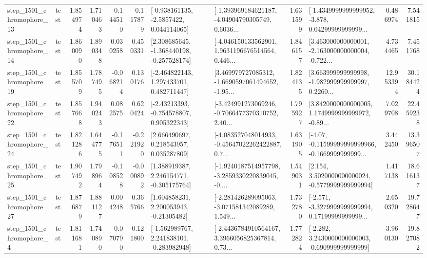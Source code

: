 \begin{tabular}{llrrrrllrlrr}
 step\_1501\_chromophore\_13 &      test &      1.854974 &    1.710463 &     -0.144510 & -0.117879 &     [-0.938161135, -2.5857422, 0.044114065] &  [-1.393969184621187, -4.04904790305749, 0.6036... &       1.631599 &  [-1.4349999999999952, -3.878, 0.04299999999999... &            0.486974 &          7.541815 \\
 step\_1501\_chromophore\_14 &      test &      1.860090 &    1.890348 &      0.030258 &  0.450331 &   [2.308685645, -1.368440198, -0.257528174] &  [-4.046150133562901, 1.9631196676514564, 0.446... &       1.846157 &  [3.463000000000001, -2.163000000000004, -0.722... &            4.734465 &          7.451768 \\
 step\_1501\_chromophore\_19 &      test &      1.855709 &    1.787495 &     -0.068214 &  0.130176 &    [-2.464822143, 1.297433701, 0.482711447] &  [3.469979727085312, -1.6690597061494652, -1.95... &       1.824135 &  [3.663999999999998, -1.982999999999997, 0.2260... &           12.953394 &         30.184424 \\
 step\_1501\_chromophore\_22 &      test &      1.857668 &    1.940243 &      0.082575 &  0.620424 &    [-2.43213393, -0.754578807, 0.905322343] &  [-3.424991273069246, -0.7066477370310752, 2.40... &       1.795927 &  [3.8420000000000005, 1.1749999999999972, -0.89... &            7.029708 &         22.459238 \\
 step\_1501\_chromophore\_24 &      test &      1.821286 &    1.644775 &     -0.176511 & -0.221920 &     [2.666490697, 0.218543957, 0.035287809] &  [-4.083527048014933, -0.45647022262422887, 0.7... &       1.631905 &  [-4.07, -0.11599999999999966, -0.1669999999999... &            3.442450 &         13.396507 \\
 step\_1501\_chromophore\_25 &      test &      1.907492 &    1.798964 &     -0.108528 & -0.000892 &    [1.388919387, 2.246154771, -0.305175764] &  [-1.9240187514957798, -3.2859330220839045, -0.... &       1.549031 &   [2.154, 3.5020000000000024, -0.5779999999999994] &            1.417138 &         18.616137 \\
 step\_1501\_chromophore\_27 &      test &      1.876879 &    1.881127 &      0.004248 &  0.365766 &     [1.604858231, 2.200053943, -0.21305482] &  [-2.281426289095063, -3.071581342089289, 1.549... &       1.732780 &  [-2.571, -3.3279999999999994, 0.17199999999999... &            2.650320 &         19.728647 \\
  step\_1501\_chromophore\_4 &      test &      1.811681 &    1.740890 &     -0.070790 &  0.121800 &   [-1.562989767, 2.241838101, -0.283982948] &  [-2.4436784910564167, 3.3966056825367814, 0.73... &       1.772824 &   [-2.282, 3.2430000000000003, -0.690999999999999] &            3.960130 &         19.827082 \\

\end{tabular}
